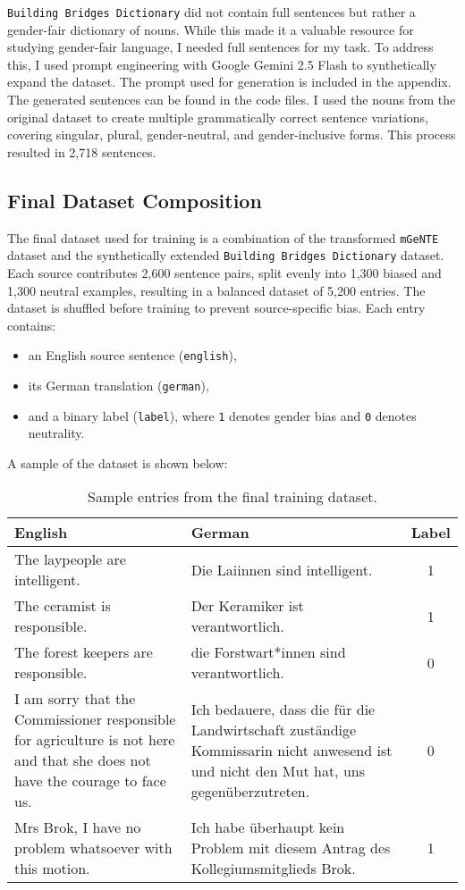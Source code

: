 \texttt{Building Bridges Dictionary} did not contain full sentences but rather a gender-fair dictionary of nouns. While this made it a valuable resource for studying gender-fair language, I needed full sentences for my task. To address this, I used prompt engineering with Google Gemini 2.5 Flash to synthetically expand the dataset. The prompt used for generation is included in the appendix. The generated sentences can be found in the code files. I used the nouns from the original dataset to create multiple grammatically correct sentence variations, covering singular, plural, gender-neutral, and gender-inclusive forms. This process resulted in 2,718 sentences.

\subsection{Final Dataset Composition}
The final dataset used for training is a combination of the transformed \texttt{mGeNTE} dataset and the synthetically extended \texttt{Building Bridges Dictionary} dataset. Each source contributes 2,600 sentence pairs, split evenly into 1,300 biased and 1,300 neutral examples, resulting in a balanced dataset of 5,200 entries. The dataset is shuffled before training to prevent source-specific bias. Each entry contains:
\begin{itemize}
    \item an English source sentence (\texttt{english}),
    \item its German translation (\texttt{german}),
    \item and a binary label (\texttt{label}), where \texttt{1} denotes gender bias and \texttt{0} denotes neutrality.
\end{itemize}

\noindent A sample of the dataset is shown below:

\begin{table}[ht!]
\renewcommand{\arraystretch}{1.2}
\setlength{\tabcolsep}{6pt}
\begin{tabularx}{\textwidth}{>{\raggedright\arraybackslash}X >{\raggedright\arraybackslash}X c}
\toprule
\textbf{English} & \textbf{German} & \textbf{Label} \\
\midrule
The laypeople are intelligent. & Die Laiinnen sind intelligent. & 1 \\
The ceramist is responsible. & Der Keramiker ist verantwortlich. & 1 \\
The forest keepers are responsible. & die Forstwart*innen sind verantwortlich. & 0 \\
I am sorry that the Commissioner responsible for agriculture is not here and that she does not have the courage to face us. & Ich bedauere, dass die für die Landwirtschaft zuständige Kommissarin nicht anwesend ist und nicht den Mut hat, uns gegenüberzutreten. & 0 \\
Mrs Brok, I have no problem whatsoever with this motion. & Ich habe überhaupt kein Problem mit diesem Antrag des Kollegiumsmitglieds Brok. & 1 \\
\bottomrule
\end{tabularx}
\caption{Sample entries from the final training dataset.}
\end{table}

